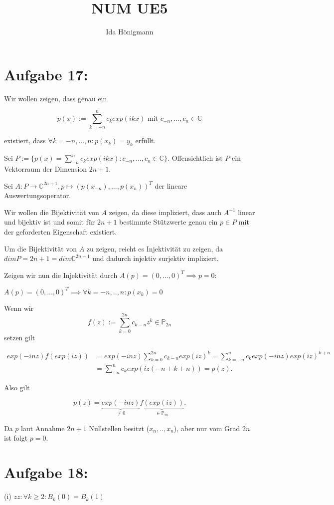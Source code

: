 \documentclass[]{article}
\title{NUM UE5}
\author{Ida Hönigmann}
\begin{document}
\maketitle

\section{Aufgabe 17:}

Wir wollen zeigen, dass genau ein

\[
p(x):=\sum_{k=-n}^{n} c_k exp(ikx) \text{ mit } c_{-n}, ..., c_n \in \mathbb{C}
\]

existiert, dass $\forall k=-n, ..., n: p(x_k)=y_k$ erfüllt.

Sei $P:=\{p(x)=\sum_{-n}^{n}c_k exp(ikx) : c_{-n}, ..., c_n \in \mathbb{C}\}$. Offensichtlich ist $P$ ein Vektorraum der Dimension $2n+1$.

Sei $A:P\rightarrow \mathbb{C}^{2n+1}, p \mapsto (p(x_{-n}), ..., p(x_n))^T$ der lineare Auswertungsoperator.

Wir wollen die Bijektivität von $A$ zeigen, da diese impliziert, dass auch $A^{-1}$ linear und bijektiv ist und somit für $2n+1$ bestimmte Stützwerte genau ein $p \in P$ mit der geforderten Eigenschaft existiert.

Um die Bijektivität von $A$ zu zeigen, reicht es Injektivität zu zeigen, da $dim P = 2n+1 = dim \mathbb{C}^{2n+1}$ und dadurch injektiv surjektiv impliziert.

Zeigen wir nun die Injektivität durch $A(p)=(0, ..., 0)^T \implies p = 0$:

$A(p) = (0, ..., 0)^T \implies \forall k=-n, .., n: p(x_k) = 0$

Wenn wir 
\[f(z):=\sum_{k=0}^{2n}c_{k-n}z^k \in \mathbb{P}_{2n}\]
setzen gilt

\begin{align*}
	exp(-inz) f(exp(iz)) &= exp(-inz) \sum_{k=0}^{2n}c_{k-n}exp(iz)^k = \sum_{k=-n}^{n}c_k exp(-inz) exp(iz)^{k+n} \\ &= \sum_{-n}^{n}c_k exp(iz(-n+k+n)) = p(z).
\end{align*}

Also gilt

\[
p(z) = \underbrace{exp(-inz)}_{\neq 0} \underbrace{f(exp(iz))}_{\in \mathbb{P}_{2n}}.
\]

Da $p$ laut Annahme $2n+1$ Nullstellen besitzt ($x_n, .., x_n$), aber nur vom Grad $2n$ ist folgt $p=0$.

\newpage

\section{Aufgabe 18:}
(i) $zz: \forall k \geq 2: B_k(0) = B_k(1)$
\end{document}
